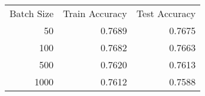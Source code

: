 \begin{tabular}{rrr}
Batch Size & Train Accuracy & Test Accuracy \\
50 & 0.7689 & 0.7675 \\
100 & 0.7682 & 0.7663 \\
500 & 0.7620 & 0.7613 \\
1000 & 0.7612 & 0.7588 \\
\end{tabular}
